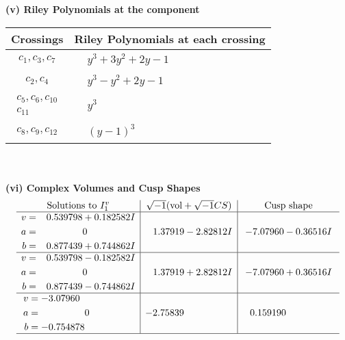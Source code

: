 \documentclass[1p]{elsarticle_modified}
\theoremstyle{definition}
\newcommand{\I}{\sqrt{-1}}
\begin{document}
\newpage\renewcommand{\arraystretch}{1}
\flushleft \textbf{(v) Riley Polynomials at the component}\newline \\
\begin{tabular}{m{50pt}|m{274pt}}
Crossings & \hspace{64pt}Riley Polynomials at each crossing \\
\hline $$\begin{aligned}c_{1},c_{3},c_{7}\end{aligned}$$&$\begin{aligned}
&y^3+3 y^2+2 y-1
\end{aligned}$\\
\hline $$\begin{aligned}c_{2},c_{4}\end{aligned}$$&$\begin{aligned}
&y^3- y^2+2 y-1
\end{aligned}$\\
\hline $$\begin{aligned}c_{5},c_{6},c_{10}\\c_{11}\end{aligned}$$&$\begin{aligned}
&y^3
\end{aligned}$\\
\hline $$\begin{aligned}c_{8},c_{9},c_{12}\end{aligned}$$&$\begin{aligned}
&(y-1)^3
\end{aligned}$\\
\hline
\end{tabular}\\~\\
\newpage\flushleft \textbf{(vi) Complex Volumes and Cusp Shapes}
$$\begin{array}{c|c|c}  
\text{Solutions to }I^v_{1}& \I (\text{vol} + \sqrt{-1}CS) & \text{Cusp shape}\\
 \hline 
\begin{aligned}
v &= \phantom{-}0.539798 + 0.182582 I \\
a &= \phantom{-0.000000 } 0 \\
b &= \phantom{-}0.877439 + 0.744862 I\end{aligned}
 & \phantom{-}1.37919 - 2.82812 I & -7.07960 - 0.36516 I \\ \hline\begin{aligned}
v &= \phantom{-}0.539798 - 0.182582 I \\
a &= \phantom{-0.000000 } 0 \\
b &= \phantom{-}0.877439 - 0.744862 I\end{aligned}
 & \phantom{-}1.37919 + 2.82812 I & -7.07960 + 0.36516 I \\ \hline\begin{aligned}
v &= -3.07960\phantom{ +0.000000I} \\
a &= \phantom{-0.000000 } 0 \\
b &= -0.754878\phantom{ +0.000000I}\end{aligned}
 & -2.75839\phantom{ +0.000000I} & \phantom{-}0.159190\phantom{ +0.000000I}\\
 \hline 
 \end{array}$$\newpage
\end{document}
